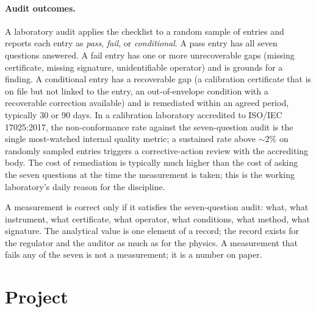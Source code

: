 \paragraph{Audit outcomes.} A laboratory audit applies the
checklist to a random sample of entries and reports each entry as
\emph{pass}, \emph{fail}, or \emph{conditional}. A pass entry has
all seven questions answered. A fail entry has one or more
unrecoverable gaps (missing certificate, missing signature,
unidentifiable operator) and is grounds for a finding. A
conditional entry has a recoverable gap (a calibration certificate
that is on file but not linked to the entry, an out-of-envelope
condition with a recoverable correction available) and is
remediated within an agreed period, typically 30 or 90 days. In a
calibration laboratory accredited to ISO/IEC 17025:2017, the
non-conformance rate against the seven-question audit is the
single most-watched internal quality metric; a sustained rate above
$\sim 2\%$ on randomly sampled entries triggers a corrective-action
review with the accrediting body. The cost of remediation is
typically much higher than the cost of asking the seven questions
at the time the measurement is taken; this is the working
laboratory's daily reason for the discipline.

\begin{principle}
A measurement is correct only if it satisfies the seven-question
audit: what, what instrument, what certificate, what operator,
what conditions, what method, what signature. The analytical value
is one element of a record; the record exists for the regulator
and the auditor as much as for the physics. A measurement that
fails any of the seven is not a measurement; it is a number on
paper.
\end{principle}

\section{Project}

